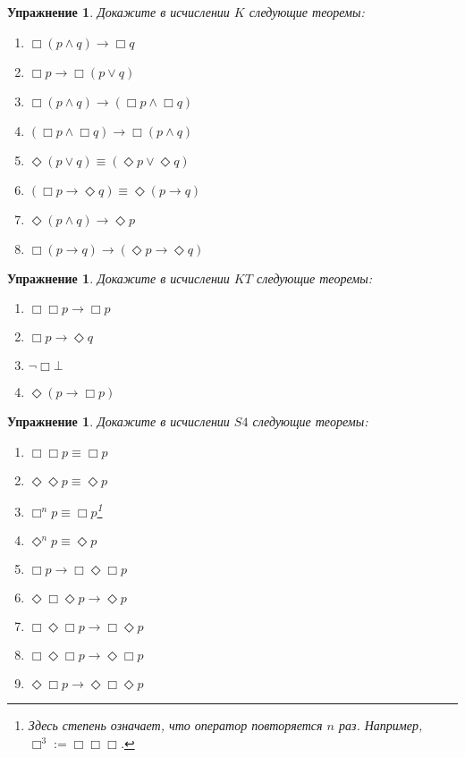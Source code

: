 \documentclass[11pt]{article}
\newtheorem{exercise}[theorem]{Упражнение}
\begin{document}
\begin{exercise}
Докажите в исчислении $K$ следующие теоремы:
\begin{multicols}{2}
\begin{enumerate}
  \item $\Box (p \wedge q) \to \Box q$
  \item $\Box p \to \Box (p \vee q)$
  \item $\Box (p \wedge q) \to (\Box p \wedge \Box q)$
  \item $(\Box p \wedge \Box q) \to \Box (p \wedge q)$
  \item $\Diamond (p \lor q) \equiv (\Diamond p \vee \Diamond q)$
  \item $(\Box p \to \Diamond q) \equiv \Diamond (p \to q)$
  \item $\Diamond (p \wedge q) \to \Diamond p$
  \item $\Box (p \to q) \to (\Diamond p \to \Diamond q)$
\end{enumerate}	
\end{multicols}
\end{exercise}

\begin{exercise}
Докажите в исчислении $KT$ следующие теоремы:
\begin{multicols}{2}
	\begin{enumerate}
		\item $\Box \Box p \to \Box p$
		\item $\Box p \to \Diamond q$
		\item $\neg \Box \bot$
		\item $\Diamond (p \to \Box p)$
	\end{enumerate}
\end{multicols}
\end{exercise}

\begin{exercise}
Докажите в исчислении $S4$ следующие теоремы:
\begin{multicols}{3}
	\begin{enumerate}
		\item $\Box \Box p \equiv \Box p$
		\item $\Diamond \Diamond p \equiv \Diamond p$
		\item $\Box^n p \equiv \Box p$\footnote{Здесь степень означает, что оператор повторяется $n$ раз. Например, $\Box^3:= \Box \Box \Box$.}
		\item  $\Diamond^n p \equiv \Diamond p$
		\item $\Box p \to \Box \Diamond \Box p $
		\item $\Diamond \Box \Diamond p \to \Diamond p$
		\item $\Box \Diamond \Box p \to \Box \Diamond p$
	   \item $\Box \Diamond \Box p \to \Diamond \Box p$
		\item $\Diamond \Box p \to \Diamond \Box \Diamond p$
	\end{enumerate}
\end{multicols}
\end{exercise}
\end{document}
